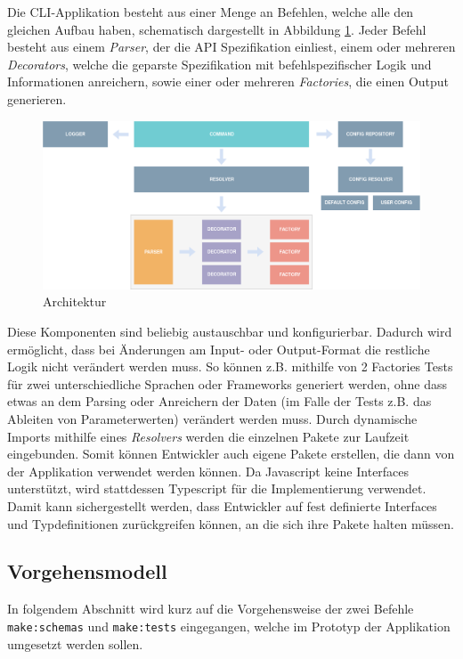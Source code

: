 Die CLI-Applikation besteht aus einer Menge an Befehlen, welche alle den gleichen Aufbau haben, schematisch dargestellt in Abbildung \ref{fig:architecture}. Jeder Befehl besteht aus einem \emph{Parser}, der die API Spezifikation einliest, einem oder mehreren \emph{Decorators}, welche die geparste Spezifikation mit befehlspezifischer Logik und Informationen anreichern, sowie einer oder mehreren \emph{Factories}, die einen Output generieren. \\

\begin{figure}[H]
\centering
  \includegraphics[width=\textwidth]{../images/architecture-model.png}
  \caption{Architektur}
  \label{fig:architecture}
\end{figure}

Diese Komponenten sind beliebig austauschbar und konfigurierbar. Dadurch wird ermöglicht, dass bei Änderungen am Input- oder Output-Format die restliche Logik nicht verändert werden muss. So können z.B. mithilfe von 2 Factories Tests für zwei unterschiedliche Sprachen oder Frameworks generiert werden, ohne dass etwas an dem Parsing oder Anreichern der Daten (im Falle der Tests z.B. das Ableiten von Parameterwerten) verändert werden muss. Durch dynamische Imports mithilfe eines \emph{Resolvers} werden die einzelnen Pakete zur Laufzeit eingebunden. Somit können Entwickler auch eigene Pakete erstellen, die dann von der Applikation verwendet werden können. Da Javascript keine Interfaces unterstützt, wird stattdessen Typescript für die Implementierung verwendet. Damit kann sichergestellt werden, dass Entwickler auf fest definierte Interfaces und Typdefinitionen zurückgreifen können, an die sich ihre Pakete halten müssen. 



\subsection{Vorgehensmodell}
In folgendem Abschnitt wird kurz auf die Vorgehensweise der zwei Befehle \lstinline|make:schemas| und \lstinline|make:tests| eingegangen, welche im Prototyp der Applikation umgesetzt werden sollen. 

